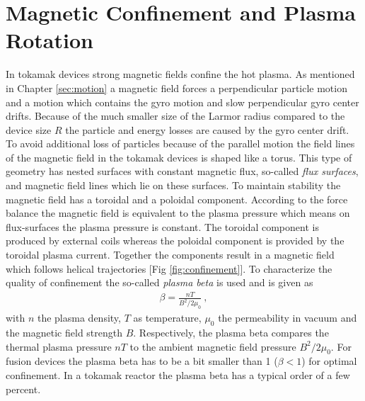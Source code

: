 \newpage
\section{Magnetic Confinement and Plasma Rotation}
\label{sec:confinement}

In tokamak devices strong magnetic fields confine the hot plasma. As mentioned in Chapter \ref{sec:motion} a magnetic field forces a perpendicular particle motion and a motion which contains the gyro motion and slow perpendicular gyro center drifts. Because of the much smaller size of the Larmor radius compared to the device size $R$ the particle and energy losses are caused by the gyro center drift. To avoid additional loss of particles because of the parallel motion the field lines of the magnetic field in the tokamak devices is shaped like a torus. This type of geometry has nested surfaces with constant magnetic flux, so-called \textit{flux surfaces}, and magnetic field lines which lie on these surfaces. To maintain stability the magnetic field has a toroidal and a poloidal component. According to the force balance the magnetic field is equivalent to the plasma pressure which means on flux-surfaces the plasma pressure is constant. \cite{Stroth2011, Wesson2011} The toroidal component is produced by external coils whereas the poloidal component is provided by the toroidal plasma current. Together the components result in a magnetic field which follows helical trajectories [Fig \ref{fig:confinement}]. To characterize the quality of confinement the so-called \textit{plasma beta} is used and is given as
\begin{gather}
    \beta = \frac{nT}{B^2/2\mu_0}~,
\end{gather} 
with $n$ the plasma density, $T$ as temperature, $\mu_0$ the permeability in vacuum and the magnetic field strength $B$. Respectively, the plasma beta compares the thermal plasma pressure $nT$ to the ambient magnetic field pressure $B^2/2\mu_0 $. For fusion devices the plasma beta has to be a bit smaller than 1 ($\beta < 1$) for optimal confinement. In a tokamak reactor the plasma beta has a typical order of a few percent. \cite{Wesson2011}

